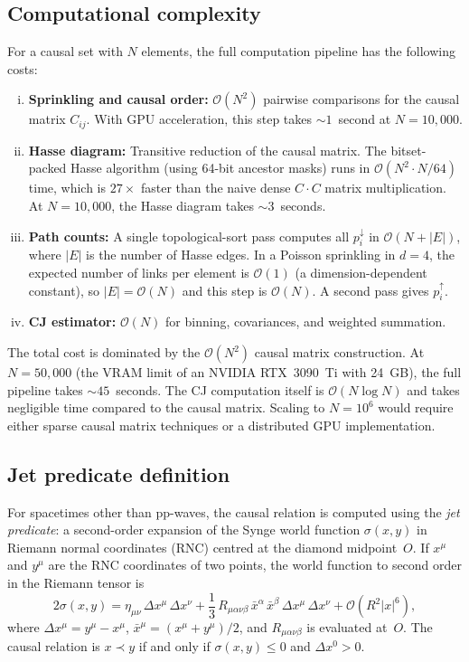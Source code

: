 \documentclass[12pt,a4paper]{article}
\theoremstyle{plain}
\theoremstyle{definition}
\theoremstyle{remark}
\newcommand{\order}{\mathcal{O}}
\begin{document}
\subsection{Computational complexity}
\label{sec:complexity}

For a causal set with $N$ elements, the full computation pipeline
has the following costs:
\begin{enumerate}[(i)]
\item \textbf{Sprinkling and causal order:} $\order(N^2)$ pairwise
  comparisons for the causal matrix $C_{ij}$.  With GPU
  acceleration, this step takes $\sim 1$~second at $N = 10{,}000$.
\item \textbf{Hasse diagram:} Transitive reduction of the causal
  matrix.  The bitset-packed Hasse algorithm (using 64-bit ancestor
  masks) runs in $\order(N^2 \cdot N/64)$ time, which is $27\times$
  faster than the naive dense $C \cdot C$ matrix multiplication.
  At $N = 10{,}000$, the Hasse diagram takes $\sim 3$~seconds.
\item \textbf{Path counts:} A single topological-sort pass computes
  all $p_i^{\downarrow}$ in $\order(N + |E|)$, where $|E|$ is the
  number of Hasse edges.  In a Poisson sprinkling in $d = 4$, the
  expected number of links per element is $\order(1)$
  (a dimension-dependent constant), so $|E| = \order(N)$ and this
  step is $\order(N)$.  A second pass gives $p_i^{\uparrow}$.
\item \textbf{CJ estimator:} $\order(N)$ for binning, covariances,
  and weighted summation.
\end{enumerate}
The total cost is dominated by the $\order(N^2)$ causal matrix
construction.  At $N = 50{,}000$ (the VRAM limit of an NVIDIA
RTX~3090~Ti with 24~GB), the full pipeline takes $\sim 45$~seconds.
The CJ computation itself is $\order(N \log N)$ and takes negligible
time compared to the causal matrix.  Scaling to $N = 10^6$ would
require either sparse causal matrix techniques or a distributed
GPU implementation.

\subsection{Jet predicate definition}
\label{sec:jet-def}

For spacetimes other than pp-waves, the causal relation is
computed using the \emph{jet predicate}: a second-order
expansion of the Synge world function $\sigma(x, y)$ in Riemann
normal coordinates (RNC) centred at the diamond midpoint~$O$.
If $x^\mu$ and $y^\mu$ are the RNC coordinates of two points,
the world function to second order in the Riemann tensor is
\begin{equation}\label{eq:jet}
  2\sigma(x, y) = \eta_{\mu\nu}\, \Delta x^\mu\, \Delta x^\nu
  + \frac{1}{3}\, R_{\mu\alpha\nu\beta}\,
    \bar{x}^\alpha\, \bar{x}^\beta\, \Delta x^\mu\, \Delta x^\nu
  + \order(R^2 |x|^6),
\end{equation}
where $\Delta x^\mu = y^\mu - x^\mu$,
$\bar{x}^\mu = (x^\mu + y^\mu)/2$, and $R_{\mu\alpha\nu\beta}$ is
evaluated at~$O$.  The causal relation is $x \prec y$ if and only
if $\sigma(x, y) \leq 0$ and $\Delta x^0 > 0$.
\end{document}
